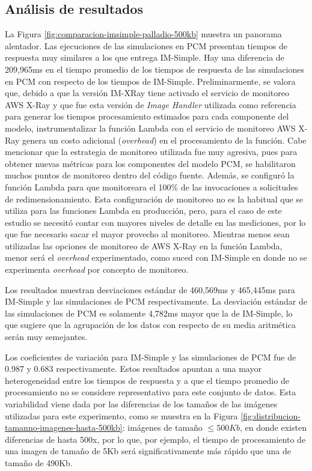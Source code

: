 \subsection{Análisis de resultados} 
La Figura \ref{fig:comparacion-imsimple-palladio-500kb} muestra un panorama alentador. Las ejecuciones de las simulaciones en PCM presentan tiempos de respuesta muy similares a los que entrega IM-Simple. Hay una diferencia de 209,965ms en el tiempo promedio de los tiempos de respuesta de las simulaciones en PCM con respecto de los tiempos de IM-Simple. Preliminarmente, se valora que, debido a que la versión IM-XRay tiene activado el servicio de monitoreo AWS X-Ray y que fue esta versión de \emph{Image Handler} utilizada como referencia para generar los tiempos procesamiento estimados para cada componente del modelo, instrumentalizar la función Lambda con el servicio de monitoreo AWS X-Ray genera un costo adicional (\emph{overhead}) en el procesamiento de la función. Cabe mencionar que la estrategia de monitoreo utilizada fue muy agresiva, pues para obtener nuevas métricas para los componentes del modelo PCM, se habilitaron muchos puntos de monitoreo dentro del código fuente. Además, se configuró la función Lambda para que monitoreara el 100\% de las invocaciones a solicitudes de redimensionamiento. Esta configuración de monitoreo no es la habitual que se utiliza para las funciones Lambda en producción, pero, para el caso de este estudio se necesitó contar con mayores niveles de detalle en las mediciones, por lo que fue necesario sacar el mayor provecho al monitoreo. Mientras menos sean utilizadas las opciones de monitoreo de AWS X-Ray en la función Lambda, menor será el \emph{overhead} experimentado, como suced con IM-Simple en donde no se experimenta \emph{overhead} por concepto de monitoreo.

Los resultados muestran desviaciones estándar de 460,569ms y 465,445ms para IM-Simple y las simulaciones de PCM respectivamente. La desviación estándar de las simulaciones de PCM es solamente 4,782ms mayor que la de IM-Simple, lo que sugiere que la agrupación de los datos con respecto de su media aritmética serán muy semejantes.

Los coeficientes de variación para IM-Simple y las simulaciones de PCM fue de 0.987 y 0.683 respectivamente. Estos resultados apuntan a una mayor heterogeneidad entre los tiempos de respuesta y a que el tiempo promedio de procesamiento no se considere representativo para este conjunto de datos. Esta variabilidad viene dada por las diferencias de los tamaños de las imágenes utilizadas para este experimento, como se muestra en la Figura \ref{fig:distribucion-tamanno-imagenes-hasta-500kb}: imágenes de tamaño $\leq 500Kb$, en donde existen diferencias de hasta 500x, por lo que, por ejemplo, el tiempo de procesamiento de una imagen de tamaño de 5Kb será significativamente más rápido que una de tamaño de 490Kb.

